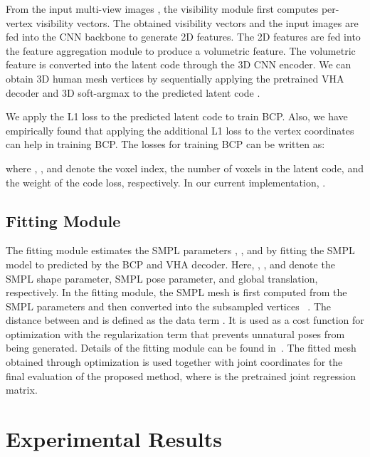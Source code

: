 \documentclass{article}
\begin{document}
From the input multi-view images , the visibility module first computes per-vertex visibility vectors. The obtained visibility vectors and the input images are fed into the CNN backbone to generate  2D features. The  2D features are fed into the feature aggregation module to produce a volumetric feature. The volumetric feature is converted into the latent code  through the 3D CNN encoder. We can obtain 3D human mesh vertices  by sequentially applying the pretrained VHA decoder and 3D soft-argmax to the predicted latent code .

We apply the L1 loss to the predicted latent code  to train BCP. Also, we have empirically found that applying the additional L1 loss to the vertex coordinates  can help in training BCP. The losses for training BCP can be written as:



where , , and  denote the voxel index, the number of voxels in the latent code, and the weight of the code loss, respectively. In our current implementation, .


\subsection{Fitting Module}
\label{ssec:fitting_module}

The fitting module estimates the SMPL parameters , , and  by fitting the SMPL model to  predicted by the BCP and VHA decoder. Here, , , and  denote the SMPL shape parameter, SMPL pose parameter, and global translation, respectively. In the fitting module, the SMPL mesh  is first computed from the SMPL parameters and then converted into the subsampled vertices ~\cite{COMA_ECCV18, Chun_2023_WACV}. The distance between  and  is defined as the data term . It is used as a cost function for optimization with the regularization term  that prevents unnatural poses from being generated. Details of the fitting module can be found in~\cite{Chun_2023_WACV}. The fitted mesh  obtained through optimization is used together with joint coordinates  for the final evaluation of the proposed method, where  is the pretrained joint regression matrix.










\section{Experimental Results}
\label{sec:experimental_results}
\end{document}
